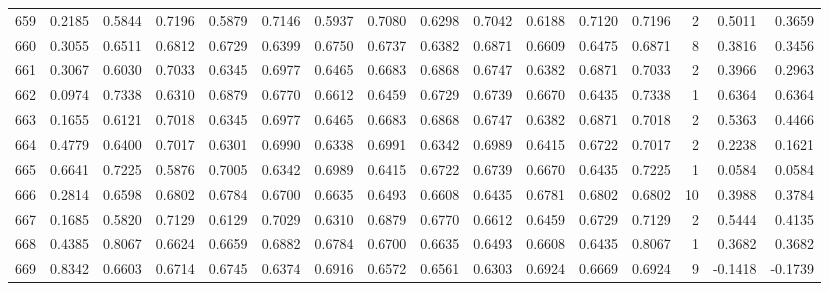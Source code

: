 \begin{tabular}{lrrrrrrrrrrrrrrr}
659 &      0.2185 &  0.5844 &  0.7196 &  0.5879 &  0.7146 &  0.5937 &  0.7080 &  0.6298 &  0.7042 &  0.6188 &   0.7120 &     0.7196 &      2 &                    0.5011 &                     0.3659 \\
660 &      0.3055 &  0.6511 &  0.6812 &  0.6729 &  0.6399 &  0.6750 &  0.6737 &  0.6382 &  0.6871 &  0.6609 &   0.6475 &     0.6871 &      8 &                    0.3816 &                     0.3456 \\
661 &      0.3067 &  0.6030 &  0.7033 &  0.6345 &  0.6977 &  0.6465 &  0.6683 &  0.6868 &  0.6747 &  0.6382 &   0.6871 &     0.7033 &      2 &                    0.3966 &                     0.2963 \\
662 &      0.0974 &  0.7338 &  0.6310 &  0.6879 &  0.6770 &  0.6612 &  0.6459 &  0.6729 &  0.6739 &  0.6670 &   0.6435 &     0.7338 &      1 &                    0.6364 &                     0.6364 \\
663 &      0.1655 &  0.6121 &  0.7018 &  0.6345 &  0.6977 &  0.6465 &  0.6683 &  0.6868 &  0.6747 &  0.6382 &   0.6871 &     0.7018 &      2 &                    0.5363 &                     0.4466 \\
664 &      0.4779 &  0.6400 &  0.7017 &  0.6301 &  0.6990 &  0.6338 &  0.6991 &  0.6342 &  0.6989 &  0.6415 &   0.6722 &     0.7017 &      2 &                    0.2238 &                     0.1621 \\
665 &      0.6641 &  0.7225 &  0.5876 &  0.7005 &  0.6342 &  0.6989 &  0.6415 &  0.6722 &  0.6739 &  0.6670 &   0.6435 &     0.7225 &      1 &                    0.0584 &                     0.0584 \\
666 &      0.2814 &  0.6598 &  0.6802 &  0.6784 &  0.6700 &  0.6635 &  0.6493 &  0.6608 &  0.6435 &  0.6781 &   0.6802 &     0.6802 &     10 &                    0.3988 &                     0.3784 \\
667 &      0.1685 &  0.5820 &  0.7129 &  0.6129 &  0.7029 &  0.6310 &  0.6879 &  0.6770 &  0.6612 &  0.6459 &   0.6729 &     0.7129 &      2 &                    0.5444 &                     0.4135 \\
668 &      0.4385 &  0.8067 &  0.6624 &  0.6659 &  0.6882 &  0.6784 &  0.6700 &  0.6635 &  0.6493 &  0.6608 &   0.6435 &     0.8067 &      1 &                    0.3682 &                     0.3682 \\
669 &      0.8342 &  0.6603 &  0.6714 &  0.6745 &  0.6374 &  0.6916 &  0.6572 &  0.6561 &  0.6303 &  0.6924 &   0.6669 &     0.6924 &      9 &                   -0.1418 &                    -0.1739 \\

\end{tabular}
